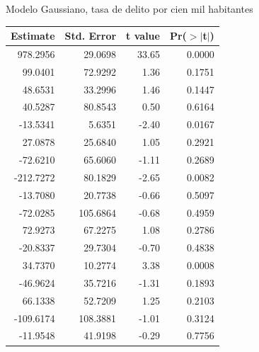 \documentclass[ignorenonframetext,]{beamer}
\begin{document}
\begin{frame}{Modelo Gaussiano, tasa de delito por cien mil habitantes}

\begin{table}[ht]
\centering
{\tiny
\begin{tabular}{rrrr}
  \hline
Estimate & Std. Error & t value & Pr($>$$|$t$|$) \\ 
  \hline
978.2956 & 29.0698 & 33.65 & 0.0000 \\ 
  99.0401 & 72.9292 & 1.36 & 0.1751 \\ 
  48.6531 & 33.2996 & 1.46 & 0.1447 \\ 
  40.5287 & 80.8543 & 0.50 & 0.6164 \\ 
  -13.5341 & 5.6351 & -2.40 & 0.0167 \\ 
  27.0878 & 25.6840 & 1.05 & 0.2921 \\ 
  -72.6210 & 65.6060 & -1.11 & 0.2689 \\ 
  -212.7272 & 80.1829 & -2.65 & 0.0082 \\ 
  -13.7080 & 20.7738 & -0.66 & 0.5097 \\ 
  -72.0285 & 105.6864 & -0.68 & 0.4959 \\ 
  72.9273 & 67.2275 & 1.08 & 0.2786 \\ 
  -20.8337 & 29.7304 & -0.70 & 0.4838 \\ 
  34.7370 & 10.2774 & 3.38 & 0.0008 \\ 
  -46.9624 & 35.7216 & -1.31 & 0.1893 \\ 
  66.1338 & 52.7209 & 1.25 & 0.2103 \\ 
  -109.6174 & 108.3881 & -1.01 & 0.3124 \\ 
  -11.9548 & 41.9198 & -0.29 & 0.7756 \\ 
   \hline
\end{tabular}
}
\end{table}

\end{frame}
\end{document}
